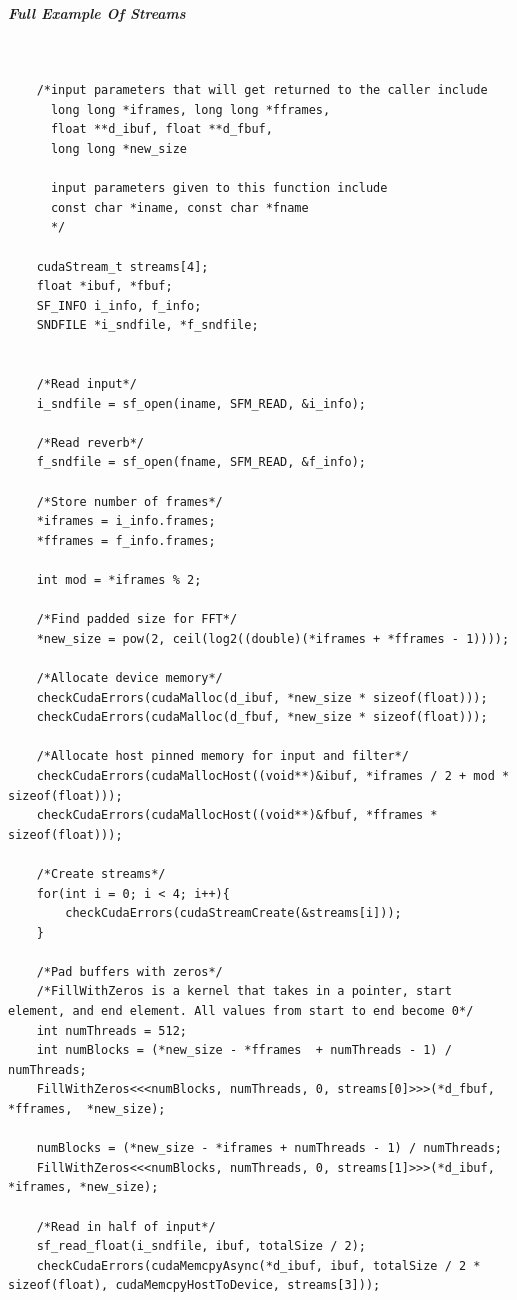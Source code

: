 \subparagraph{Full Example Of Streams} \hspace{0pt} \\
\begin{verbatim}
    /*input parameters that will get returned to the caller include 
      long long *iframes, long long *fframes, 
      float **d_ibuf, float **d_fbuf, 
      long long *new_size 
      
      input parameters given to this function include 
      const char *iname, const char *fname
      */
      
	cudaStream_t streams[4];
	float *ibuf, *fbuf;
	SF_INFO i_info, f_info;
	SNDFILE *i_sndfile, *f_sndfile;
	

	/*Read input*/
	i_sndfile = sf_open(iname, SFM_READ, &i_info);

	/*Read reverb*/
	f_sndfile = sf_open(fname, SFM_READ, &f_info);
	
	/*Store number of frames*/
	*iframes = i_info.frames;
	*fframes = f_info.frames;
	
	int mod = *iframes % 2;
	
	/*Find padded size for FFT*/
	*new_size = pow(2, ceil(log2((double)(*iframes + *fframes - 1))));
	
	/*Allocate device memory*/
	checkCudaErrors(cudaMalloc(d_ibuf, *new_size * sizeof(float)));
	checkCudaErrors(cudaMalloc(d_fbuf, *new_size * sizeof(float)));
	
	/*Allocate host pinned memory for input and filter*/
	checkCudaErrors(cudaMallocHost((void**)&ibuf, *iframes / 2 + mod * sizeof(float)));
	checkCudaErrors(cudaMallocHost((void**)&fbuf, *fframes * sizeof(float)));
	
	/*Create streams*/
	for(int i = 0; i < 4; i++){
		checkCudaErrors(cudaStreamCreate(&streams[i]));
	}
	
	/*Pad buffers with zeros*/
	/*FillWithZeros is a kernel that takes in a pointer, start element, and end element. All values from start to end become 0*/
	int numThreads = 512;
	int numBlocks = (*new_size - *fframes  + numThreads - 1) / numThreads;
	FillWithZeros<<<numBlocks, numThreads, 0, streams[0]>>>(*d_fbuf, *fframes,  *new_size);
	
	numBlocks = (*new_size - *iframes + numThreads - 1) / numThreads;
	FillWithZeros<<<numBlocks, numThreads, 0, streams[1]>>>(*d_ibuf, *iframes, *new_size);
	
	/*Read in half of input*/
	sf_read_float(i_sndfile, ibuf, totalSize / 2);
	checkCudaErrors(cudaMemcpyAsync(*d_ibuf, ibuf, totalSize / 2 * sizeof(float), cudaMemcpyHostToDevice, streams[3]));


\end{verbatim}
